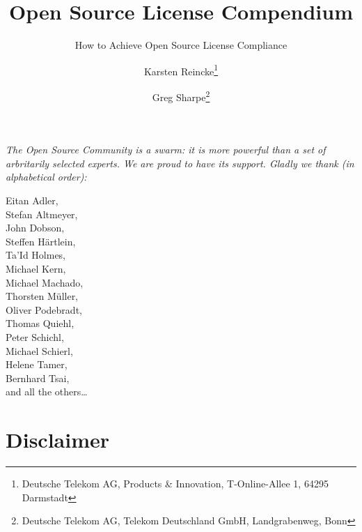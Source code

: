 \documentclass[DIV=calc,BCOR=5mm,12pt,headings=small,oneside,toc=bib]{scrbook}
\begin{document}

\titlehead{Version  %
}
\subject{\small \itshape A Practical Guide for Developers, Managers, OS Experts, 
and Companies} 

\title{Open Source License Compendium}

\subtitle{How to Achieve Open Source License Compliance}
\author{
Karsten Reincke\thanks{Deutsche Telekom AG, Products \& Innovation, 
T-Online-Allee 1, 64295 Darmstadt}
\and
Greg Sharpe\thanks{Deutsche Telekom AG, Telekom Deutschland GmbH, 
Landgrabenweg, Bonn}}

\maketitle

\footnotesize
\begin{flushright} 

\parbox{100mm}{\itshape
The Open Source Community is a swarm: it is more powerful than a set of
arbritarily selected experts. We are proud to have its support. Gladly we thank
(in alphabetical order):
}

\parbox{50mm}{
\tiny
\begin{flushright}
Eitan Adler,\\
Stefan Altmeyer,\\
John Dobson, \\
Steffen Härtlein, \\
Ta'Id Holmes, \\
Michael Kern,\\
Michael Machado,\\
Thorsten Müller,\\
Oliver Podebradt,\\
Thomas Quiehl,\\
Peter Schichl,\\
Michael Schierl,\\
Helene Tamer,\\
Bernhard Tsai,\\
and all the others\ldots
\end{flushright}
}
\end{flushright}
\normalsize
\newpage

\footnotesize
\tableofcontents
\newpage

\normalsize

\chapter*{Disclaimer}

\end{document}
